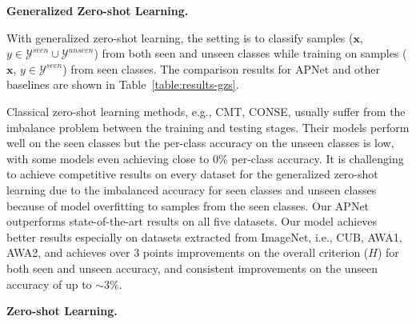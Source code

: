 \documentclass[letterpaper]{article} %
\def\Tabref#1{Table~\ref{#1}}
\def\vx{{\bm{x}}}
\begin{document}
\noindent\textbf{Generalized Zero-shot Learning.}

\noindent With generalized zero-shot learning, the setting is to classify samples ($\vx$, $y \in \mathcal{Y}^{seen}\cup\mathcal{Y}^{unseen}$) from both seen and unseen classes while training on samples ($\vx$, $y \in \mathcal{Y}^{seen}$) from seen classes. The comparison results for APNet and other baselines are shown in \Tabref{table:results-gzs}.


Classical zero-shot learning methods, e.g., CMT, CONSE, usually suffer from the imbalance problem between the training and testing stages. Their models perform well on the seen classes but the per-class accuracy on the unseen classes is low, with some models even achieving close to 0\% per-class accuracy.
It is challenging to achieve competitive results on every dataset for the generalized zero-shot learning due to the imbalanced accuracy for seen classes and unseen classes because of model overfitting to samples from the seen classes.
Our APNet outperforms state-of-the-art results on all five datasets.
Our model achieves better results especially on datasets extracted from ImageNet, i.e., CUB, AWA1, AWA2, and achieves over 3 points improvements on the overall criterion ($H$) for both seen and unseen accuracy, and
consistent improvements on the unseen accuracy of up to $\sim 3\%$.





\noindent\textbf{Zero-shot Learning.}
\end{document}
